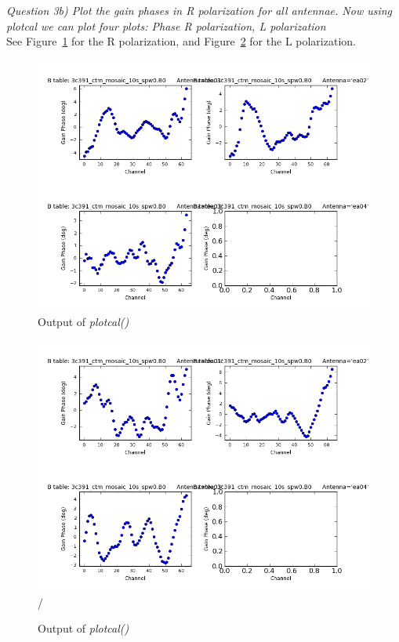 \documentclass[12pt, a4paper]{article}
\begin{document}
\noindent \textit{Question 3b) Plot the gain phases in R polarization for all antennae. Now using plotcal we can plot four plots: Phase R polarization, L polarization} \\
See Figure~\ref{fig:part4subE-q3b-R} for the R polarization, and Figure~\ref{fig:part4subE-q3b-L} for the L polarization. \\

\newpage
\begin{figure}[h!]
    \centering
    \includegraphics[scale=0.5]{../Imaging/plots/part4-subE-question3b_phase_pol-R.png}

    \caption{Output of \emph{plotcal()}  \label{fig:part4subE-q3b-R}}
\end{figure}
\begin{figure}[h!]
    \centering
    \includegraphics[scale=0.5]{../Imaging/plots/part4-subE-question3b_phase_pol-L.png}
/
    \caption{Output of \emph{plotcal()}  \label{fig:part4subE-q3b-L}}
\end{figure}
\newpage
\end{document}
